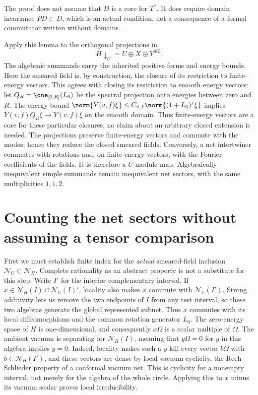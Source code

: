 The proof does not assume that $D$ is a core for $T^*$.
It does require domain invariance $PD\subset D$, which is an
actual condition, not a consequence of a formal commutator written
without domains.

Apply this lemma to the orthogonal projections in
\[
 H\downarrow_U=U\oplus X\oplus Y^{\oplus2}.
\]
The algebraic summands carry the inherited positive forms and
energy bounds. Here the smeared field is, by construction, the
closure of its restriction to finite-energy vectors. This agrees
with closing its restriction to smooth energy vectors: let
$Q_R=\one_{[0,R]}(L_0)$ be the spectral projection onto energies
between zero and $R$. The energy bound
$\norm{Y(v,f)\xi}\le C_{v,f}\norm{(1+L_0)^r\xi}$ implies
$Y(v,f)Q_R\xi\to Y(v,f)\xi$ on the smooth domain.
Thus finite-energy vectors are a core for these particular closures;
no claim about an arbitrary closed extension is needed.
The projections preserve finite-energy vectors and
commute with the modes; hence they reduce the closed smeared fields.
Conversely, a net intertwiner commutes with rotations and, on
finite-energy vectors, with the Fourier coefficients of the fields.
It is therefore a $U$-module map. Algebraically inequivalent simple
summands remain inequivalent net sectors, with the same
multiplicities $1,1,2$.

\section{Counting the net sectors without assuming a tensor comparison}

First we must establish finite index for the \emph{actual}
smeared-field inclusion $\mathcal N_U\subset\mathcal N_H$.
Complete rationality as an abstract property is not a substitute
for this step. Write $I'$ for the interior complementary interval. If
$x\in\mathcal N_H(I)\cap\mathcal N_U(I)'$, locality also makes
$x$ commute with $\mathcal N_U(I')$. Strong additivity lets us
remove the two endpoints of $I$ from any test interval, so these
two algebras generate the global represented subnet. Thus $x$
commutes with its local diffeomorphisms and the common rotation
generator $L_0$. The zero-energy space of $H$ is one-dimensional,
and consequently $x\Omega$ is a scalar multiple of $\Omega$.
The ambient vacuum is separating for $\mathcal N_H(I)$, meaning
that $y\Omega=0$ for $y$ in this algebra implies $y=0$.
Indeed, locality makes such a $y$ kill every vector
$b\Omega$ with $b\in\mathcal N_H(I')$, and these vectors are
dense by local vacuum cyclicity, the Reeh--Schlieder property
of a conformal vacuum net. This is cyclicity for a nonempty
interval, not merely for the algebra of the whole circle.
Applying this to $x$ minus its
vacuum scalar proves local irreducibility.

